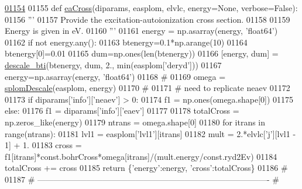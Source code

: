 \begin{DoxyCode}
\hypertarget{namespacepyneb_1_1utils_1_1__chianti__tools_l01154}{}\hyperlink{namespacepyneb_1_1utils_1_1__chianti__tools_a5c2be70e50273734d319a433bf39ce5b}{01154} 
01155 \textcolor{keyword}{def }\hyperlink{namespacepyneb_1_1utils_1_1__chianti__tools_a5c2be70e50273734d319a433bf39ce5b}{eaCross}(diparams, easplom, elvlc, energy=None, verbose=False):
01156     \textcolor{stringliteral}{'''}
01157 \textcolor{stringliteral}{    Provide the excitation-autoionization cross section.}
01158 \textcolor{stringliteral}{}
01159 \textcolor{stringliteral}{    Energy is given in eV.}
01160 \textcolor{stringliteral}{    '''}
01161     energy = np.asarray(energy, \textcolor{stringliteral}{'float64'})
01162     \textcolor{keywordflow}{if} \textcolor{keywordflow}{not} energy.any():
01163         btenergy=0.1*np.arange(10)
01164         btenergy[0]=0.01
01165         dum=np.ones(len(btenergy))
01166         [energy, dum] = \hyperlink{namespacepyneb_1_1utils_1_1__chianti__tools_a74378c74514f5b6d760d4384780fbf26}{descale\_bti}(btenergy, dum, 2., min(easplom[\textcolor{stringliteral}{'deryd'}]))
01167         energy=np.asarray(energy, \textcolor{stringliteral}{'float64'})
01168     \textcolor{comment}{#}
01169     omega = \hyperlink{namespacepyneb_1_1utils_1_1__chianti__tools_a2cd45e7b512b31d25e92f3adf69b1914}{splomDescale}(easplom, energy)
01170     \textcolor{comment}{#}
01171     \textcolor{comment}{#  need to replicate neaev}
01172 
01173     \textcolor{keywordflow}{if} diparams[\textcolor{stringliteral}{'info'}][\textcolor{stringliteral}{'neaev'}] > 0:
01174         f1 = np.ones(omega.shape[0])
01175     \textcolor{keywordflow}{else}:
01176         f1 = diparams[\textcolor{stringliteral}{'info'}][\textcolor{stringliteral}{'eaev'}]
01177 
01178     totalCross = np.zeros\_like(energy)
01179     ntrans = omega.shape[0]
01180     \textcolor{keywordflow}{for} itrans \textcolor{keywordflow}{in} range(ntrans):
01181         lvl1 = easplom[\textcolor{stringliteral}{'lvl1'}][itrans]
01182         mult = 2.*elvlc[\textcolor{stringliteral}{'j'}][lvl1 - 1] + 1.
01183         cross = f1[itrans]*const.bohrCross*omega[itrans]/(mult.energy/const.ryd2Ev)
01184         totalCross += cross
01185     \textcolor{keywordflow}{return} \{\textcolor{stringliteral}{'energy'}:energy, \textcolor{stringliteral}{'cross'}:totalCross\}
01186     \textcolor{comment}{#}
01187     \textcolor{comment}{# -------------------------------------------------------------------------------------}
    \textcolor{comment}{#}
\end{DoxyCode}
